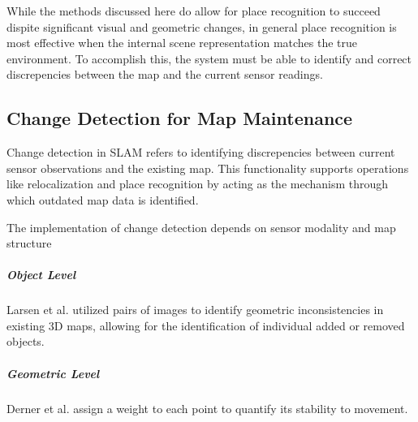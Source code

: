 While the methods discussed here do allow for place recognition to succeed dispite significant visual and geometric changes, in general place recognition is most effective when the internal scene representation matches the true environment. To accomplish this, the system must be able to identify and correct discrepencies between the map and the current sensor readings.

\subsection{Change Detection for Map Maintenance}

Change detection in SLAM refers to identifying discrepencies between current sensor observations and the existing map. This functionality supports operations like relocalization and place recognition by acting as the mechanism through which outdated map data is identified.

The implementation of change detection depends on sensor modality and map structure




\subparagraph{Object Level}
Larsen et al. \cite{larsenChangeDetectionModel} utilized pairs of images to identify geometric inconsistencies in existing 3D maps, allowing for the identification of individual added or removed objects.

\subparagraph{Geometric Level}
Derner et al. \cite{dernerChangeDetectionUsing2021} assign a weight to each point to quantify its stability to movement.




